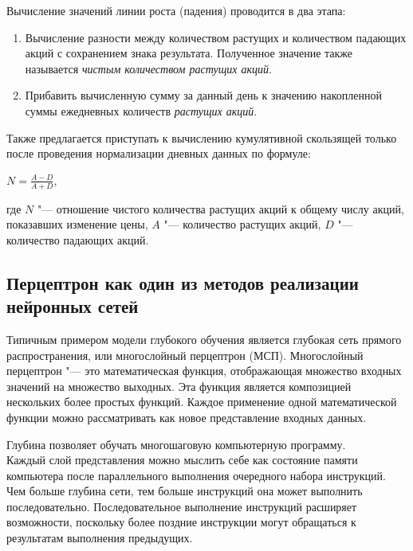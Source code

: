 \documentclass[bachelor, och, coursework]{SCWorks}
\begin{document}
            Вычисление значений линии роста (падения) проводится в два этапа:
                \begin{enumerate}
                    \item Вычисление разности между количеством растущих и
                    количеством падающих акций с сохранением знака результата.
                    Полученное значение также называется \textit{чистым
                    количеством растущих акций}.
                    \item Прибавить вычисленную сумму за данный день к значению
                    накопленной суммы ежедневных количеств \textit{растущих
                    акций}.
                \end{enumerate}

            Также предлагается приступать к вычислению кумулятивной скользящей
            только после проведения нормализации дневных данных по формуле:
                \begin{center}
                    $N = \frac{A - D}{A + D} $, 
                \end{center}
                где $N$ "--- отношение чистого количества растущих акций к
                общему числу акций, показавших изменение цены, $A$ "---
                количество растущих акций, $D$ "--- количество падающих акций.

        \subsection{Перцептрон как один из методов реализации нейронных сетей}
        
        Типичным примером модели глубокого обучения является глубокая сеть
        прямого распространения, или многослойный перцептрон (МСП). Многослойный
        перцептрон "--- это математическая функция, отображающая множество
        входных значений на множество выходных. Эта функция является композицией
        нескольких более простых функций. Каждое применение одной математической
        функции можно рассматривать как новое представление входных данных.
        
        Глубина позволяет обучать многошаговую компьютерную программу. \\Каждый
        слой представления можно мыслить себе как состояние памяти компьютера
        после параллельного выполнения очередного набора инструкций. Чем больше
        глубина сети, тем больше инструкций она может выполнить последовательно.
        Последовательное выполнение инструкций расширяет возможности, поскольку
        более поздние инструкции могут обращаться к результатам выполнения
        предыдущих.
        
\end{document}
